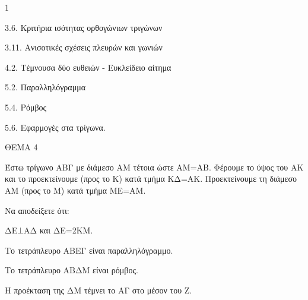 \begin{ylh}{1}
    \item 3.6. Κριτήρια ισότητας ορθογώνιων τριγώνων
    \item 3.11. Ανισοτικές σχέσεις πλευρών και γωνιών
    \item 4.2. Τέμνουσα δύο ευθειών - Ευκλείδειο αίτημα
    \item 5.2. Παραλληλόγραμμα
    \item 5.4. Ρόμβος
    \item 5.6. Εφαρμογές στα τρίγωνα.
\end{ylh}

ΘΕΜΑ 4

Έστω τρίγωνο ΑΒΓ με διάμεσο ΑΜ τέτοια ώστε ΑΜ=ΑΒ. Φέρουμε το ύψος του ΑΚ και το προεκτείνουμε (προς το Κ) κατά τμήμα ΚΔ=ΑΚ. Προεκτείνουμε τη διάμεσο ΑΜ (προς το Μ) κατά τμήμα ΜΕ=ΑΜ.

Να αποδείξετε ότι:

\begin{alist}
\item ΔΕ$\bot$ΑΔ και ΔΕ=2ΚΜ. 

\item Το τετράπλευρο ΑΒΕΓ είναι παραλληλόγραμμο. 

\item Το τετράπλευρο ΑΒΔΜ είναι ρόμβος. 

\item Η προέκταση της ΔΜ τέμνει το ΑΓ στο μέσον του Ζ. 


\end{alist}
